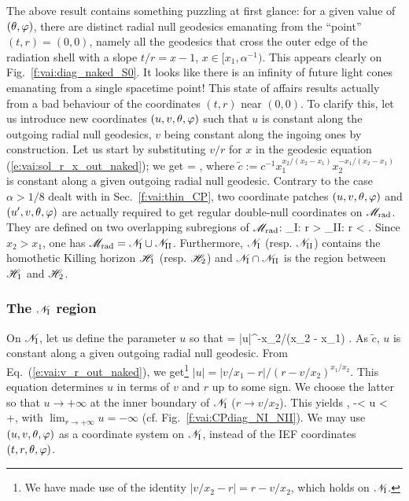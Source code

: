 The above result contains something puzzling at first glance: for a given
value of $(\theta,\varphi)$, there are distinct radial null geodesics emanating
from the ``point'' $(t, r) = (0,0)$, namely all the geodesics that
cross the outer edge of the radiation shell with a slope $t/r = x - 1$,
$x\in [x_1, \alpha^{-1})$. %
This appears clearly on Fig.~\ref{f:vai:diag_naked_S0}.
It looks like there is an infinity of future light cones emanating
from a single spacetime point!
This state of affairs results actually from a bad behaviour of the coordinates
$(t, r)$ near $(0,0)$. To clarify this, let us introduce new coordinates
$(u, v, \theta, \varphi)$ such that $u$ is constant along the
outgoing radial null geodesics, $v$ being constant along
the ingoing ones by construction. Let us start by substituting $v/r$ for $x$ in
the geodesic equation (\ref{e:vai:sol_r_x_out_naked}); we get
\be \label{e:vai:v_r_out_naked}
     = ,
\ee
where $\tilde{c} := c^{-1} x_1^{x_2/(x_2 - x_1)} x_2^{-x_1/(x_2 - x_1)}$ is
constant along a given outgoing radial null geodesic.
Contrary to the case $\alpha > 1/8$ dealt with in Sec.~\ref{f:vai:thin_CP},
two coordinate patches $(u,v,\theta,\varphi)$ and $(u',v,\theta,\varphi)$ are actually
required to get regular double-null coordinates on $\mathscr{M}_{\rm rad}$. They are defined
on two overlapping subregions of $\mathscr{M}_{\rm rad}$:
\be \label{e:vai:def_NI_NII}
    _{\rm I}: r >  \qand
    _{\rm II}: r <  .
\ee
Since $x_2 > x_1$, one has
$\mathscr{M}_{\rm rad} = \mathscr{N}_{\rm I} \cup \mathscr{N}_{\rm II}$.
Furthermore, $\mathscr{N}_{\rm I}$ (resp.  $\mathscr{N}_{\rm II}$)
contains the homothetic Killing horizon $\mathscr{H}_1$ (resp. $\mathscr{H}_2$)
and $\mathscr{N}_{\rm I} \cap \mathscr{N}_{\rm II}$ is the region
between $\mathscr{H}_1$ and $\mathscr{H}_2$.

\subsubsection{The $\mathscr{N}_{\rm I}$ region}

On $\mathscr{N}_{\rm I}$, let us define the parameter $u$ so that
\be \label{e:vai:def_u_tilde_c}
     = |u|^{-x_2/(x_2 - x_1)} .
\ee
As $\tilde{c}$, $u$ is constant along a given outgoing radial null geodesic.
From Eq.~(\ref{e:vai:v_r_out_naked}), we get\footnote{We have made use of
the identity $|v/x_2 - r| = r - v/x_2$, which holds on $ \mathscr{N}_{\rm I}$.}
$|u| = |v/x_1 - r| / (r - v/x_2)^{x_1/x_2}$. This equation determines
$u$ in terms of $v$ and $r$ up to some sign. We choose the latter so that
$u \to +\infty$ at the inner boundary of $\mathscr{N}_{\rm I}$
($r \to v/x_2$). This yields
\be \label{e:vai:u_N_I}
    , \quad -\infty < u < +\infty ,
\ee
with $\lim_{r\to +\infty} u = - \infty$ (cf. Fig.~\ref{f:vai:CPdiag_NI_NII}).
We may use $(u, v, \theta, \varphi)$ as a coordinate system on $\mathscr{N}_{\rm I}$,
instead of the IEF coordinates $(t, r, \theta, \varphi)$.


